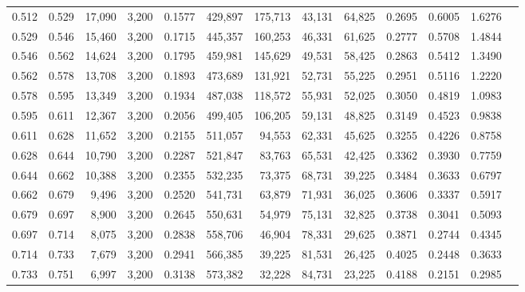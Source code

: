 \begin{tabular}{rrrrrrrrrrrrr}
0.512 & 0.529 & 17,090 & 3,200 &                                     0.1577 & 429,897 & 175,713 &  43,131 &  64,825 & 0.2695 & 0.6005 & 1.6276 \\
0.529 & 0.546 & 15,460 & 3,200 &                                     0.1715 & 445,357 & 160,253 &  46,331 &  61,625 & 0.2777 & 0.5708 & 1.4844 \\
0.546 & 0.562 & 14,624 & 3,200 &                                     0.1795 & 459,981 & 145,629 &  49,531 &  58,425 & 0.2863 & 0.5412 & 1.3490 \\
0.562 & 0.578 & 13,708 & 3,200 &                                     0.1893 & 473,689 & 131,921 &  52,731 &  55,225 & 0.2951 & 0.5116 & 1.2220 \\
0.578 & 0.595 & 13,349 & 3,200 &                                     0.1934 & 487,038 & 118,572 &  55,931 &  52,025 & 0.3050 & 0.4819 & 1.0983 \\
0.595 & 0.611 & 12,367 & 3,200 &                                     0.2056 & 499,405 & 106,205 &  59,131 &  48,825 & 0.3149 & 0.4523 & 0.9838 \\
0.611 & 0.628 & 11,652 & 3,200 &                                     0.2155 & 511,057 &  94,553 &  62,331 &  45,625 & 0.3255 & 0.4226 & 0.8758 \\
0.628 & 0.644 & 10,790 & 3,200 &                                     0.2287 & 521,847 &  83,763 &  65,531 &  42,425 & 0.3362 & 0.3930 & 0.7759 \\
0.644 & 0.662 & 10,388 & 3,200 &                                     0.2355 & 532,235 &  73,375 &  68,731 &  39,225 & 0.3484 & 0.3633 & 0.6797 \\
0.662 & 0.679 &  9,496 & 3,200 &                                     0.2520 & 541,731 &  63,879 &  71,931 &  36,025 & 0.3606 & 0.3337 & 0.5917 \\
0.679 & 0.697 &  8,900 & 3,200 &                                     0.2645 & 550,631 &  54,979 &  75,131 &  32,825 & 0.3738 & 0.3041 & 0.5093 \\
0.697 & 0.714 &  8,075 & 3,200 &                                     0.2838 & 558,706 &  46,904 &  78,331 &  29,625 & 0.3871 & 0.2744 & 0.4345 \\
0.714 & 0.733 &  7,679 & 3,200 &                                     0.2941 & 566,385 &  39,225 &  81,531 &  26,425 & 0.4025 & 0.2448 & 0.3633 \\
0.733 & 0.751 &  6,997 & 3,200 &                                     0.3138 & 573,382 &  32,228 &  84,731 &  23,225 & 0.4188 & 0.2151 & 0.2985 \\

\end{tabular}
